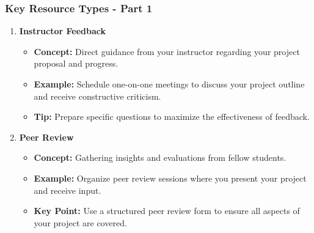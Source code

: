 \documentclass{beamer}
\begin{document}
\begin{frame}[fragile]
    \frametitle{Key Resource Types - Part 1}
    \begin{enumerate}
        \item \textbf{Instructor Feedback}
            \begin{itemize}
                \item \textbf{Concept:} Direct guidance from your instructor regarding your project proposal and progress.
                \item \textbf{Example:} Schedule one-on-one meetings to discuss your project outline and receive constructive criticism.
                \item \textbf{Tip:} Prepare specific questions to maximize the effectiveness of feedback.
            \end{itemize}
        
        \item \textbf{Peer Review}
            \begin{itemize}
                \item \textbf{Concept:} Gathering insights and evaluations from fellow students.
                \item \textbf{Example:} Organize peer review sessions where you present your project and receive input.
                \item \textbf{Key Point:} Use a structured peer review form to ensure all aspects of your project are covered.
            \end{itemize}
    \end{enumerate}
\end{frame}
\end{document}

